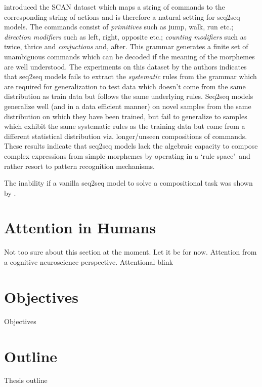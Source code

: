 \cite{Lake2017} introduced the SCAN dataset which maps a string of commands to the corresponding string of actions and is therefore a natural setting for seq2seq models. The commands consist of \textit{primitives} such as jump, walk, run etc.; \textit{direction modifiers} such as left, right, opposite etc.; \textit{counting modifiers} such as twice, thrice and \textit{conjuctions} and, after. This grammar generates a finite set of unambiguous commands which can be decoded if the meaning of the morphemes are well understood. The experiments on this dataset by the authors indicates that seq2seq models fails to extract the \textit{systematic} rules from the grammar which are required for generalization to test data which doesn't come from the same distribution as train data but follows the same underlying rules. Seq2seq models generalize well (and in a data efficient manner) on novel samples from the same distribution on which they have been trained, but fail to generalize to samples which exhibit the same systematic rules as the training data but come from a different statistical distribution viz. longer/unseen compositions of commands. These results indicate that seq2seq models lack the algebraic capacity to compose complex expressions from simple morphemes by operating in a \lq rule space{}\rq\ and rather resort to pattern recognition mechanisms.

The inability if a vanilla seq2seq model to solve a compositional task was shown by \cite{Liska2018}.

\section{Attention in Humans}
Not too sure about this section at the moment. Let it be for now. Attention from a cognitive neuroscience perspective. Attentional blink

		
\section{Objectives}
	Objectives

	
\section{Outline}
	Thesis outline

				